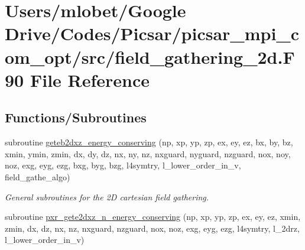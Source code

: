 \hypertarget{field__gathering__2d_8_f90}{}\section{Users/mlobet/\+Google Drive/\+Codes/\+Picsar/picsar\+\_\+mpi\+\_\+com\+\_\+opt/src/field\+\_\+gathering\+\_\+2d.F90 File Reference}
\label{field__gathering__2d_8_f90}
\subsection*{Functions/\+Subroutines}
\begin{DoxyCompactItemize}
\item 
subroutine \hyperlink{field__gathering__2d_8_f90_a5c6ac50abbe5706b3f8f33afa68a23a5}{geteb2dxz\+\_\+energy\+\_\+conserving} (np, xp, yp, zp, ex, ey, ez, bx, by, bz,                                                                                                                                                   xmin, ymin, zmin, dx, dy, dz, nx, ny, nz,                                                                                                                                                   nxguard, nyguard, nzguard,                                                                                                                                                       nox, noy, noz, exg, eyg, ezg, bxg, byg, bzg,                                                                                                                                                   l4symtry, l\+\_\+lower\+\_\+order\+\_\+in\+\_\+v, field\+\_\+gathe\+\_\+algo)
\begin{DoxyCompactList}\small\item\em General subroutines for the 2D cartesian field gathering. \end{DoxyCompactList}\item 
subroutine \hyperlink{field__gathering__2d_8_f90_ab93a0f4d8c25f1ff4ec81319daea39e2}{pxr\+\_\+gete2dxz\+\_\+n\+\_\+energy\+\_\+conserving} (np, xp, yp, zp, ex, ey, ez, xmin, zmin, dx, dz, nx, nz, nxguard, nzguard,                                                                                                                                                       nox, noz, exg, eyg, ezg, l4symtry, l\+\_\+2drz, l\+\_\+lower\+\_\+order\+\_\+in\+\_\+v)

\end{DoxyCompactItemize}
